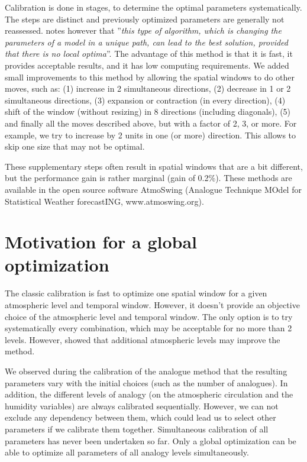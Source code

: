 \documentclass[twocol]{ametsoc}
\begin{document}
Calibration is done in stages, to determine the optimal parameters systematically. The steps are distinct and previously optimized parameters are generally not reassessed. \citet{Bontron2004} notes however that ''\textit{this type of algorithm, which is changing the parameters of a model in a unique path, can lead to the best solution, provided that there is no local optima}''. The advantage of this method is that it is fast, it provides acceptable results, and it has low computing requirements. We added small improvements to this method by allowing the spatial windows to do other moves, such as: (1) increase in 2 simultaneous directions, (2) decrease in 1 or 2 simultaneous directions, (3) expansion or contraction (in every direction), (4) shift of the window (without resizing) in 8 directions (including diagonals), (5) and finally all the moves described above, but with a factor of 2, 3, or more. For example, we try to increase by 2 units in one (or more) direction. This allows to skip one size that may not be optimal.

These supplementary steps often result in spatial windows that are a bit different, but the performance gain is rather marginal (gain of 0.2\%). These methods are available in the open source software AtmoSwing (Analogue Technique MOdel for Statistical Weather forecastING, www.atmoswing.org).


\section{Motivation for a global optimization}

The classic calibration is fast to optimize one spatial window for a given atmospheric level and temporal window. However, it doesn't provide an objective choice of the atmospheric level and temporal window. The only option is to try systematically every combination, which may be acceptable for no more than 2 levels. However, \citet{Horton2012a} showed that additional atmospheric levels may improve the method.

We observed during the calibration of the analogue method that the resulting parameters vary with the initial choices (such as the number of analogues). In addition, the different levels of analogy (on the atmospheric circulation and the humidity variables) are always calibrated sequentially. However, we can not exclude any dependency between them, which could lead us to select other parameters if we calibrate them together. Simultaneous calibration of all parameters has never been undertaken so far. Only a global optimization can be able to optimize all parameters of all analogy levels simultaneously.
\end{document}

